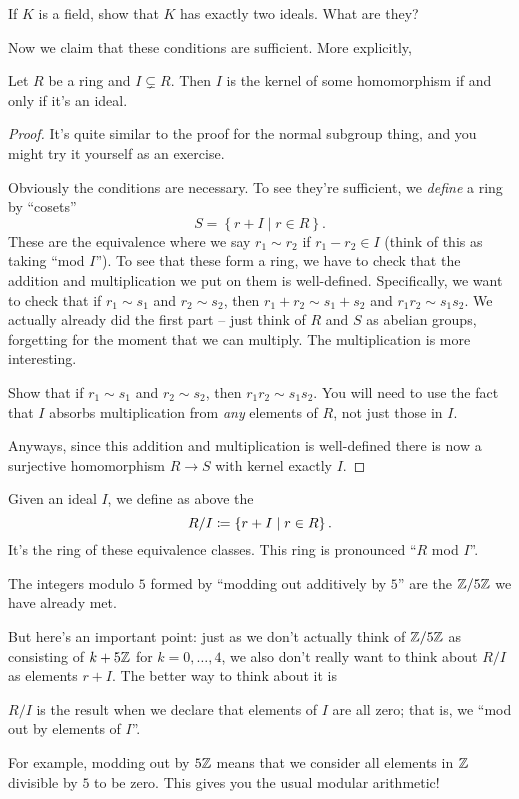 \begin{exercise}
	If $K$ is a field, show that $K$ has exactly two ideals.
	What are they?
	\label{exer:field_ideal}
\end{exercise}

Now we claim that these conditions are sufficient.
More explicitly,
\begin{theorem}
	Let $R$ be a ring and $I \subsetneq R$.
	Then $I$ is the kernel of some homomorphism if and only if it's an ideal.
\end{theorem}
\begin{proof}
	It's quite similar to the proof for the normal subgroup thing,
	and you might try it yourself as an exercise.
	
	Obviously the conditions are necessary.
	To see they're sufficient, we \emph{define} a ring by ``cosets''
	\[ S = \left\{ r + I \mid r \in R \right\}. \]
	These are the equivalence where we say $r_1 \sim r_2$ if $r_1 - r_2 \in I$
	(think of this as taking ``mod $I$'').
	To see that these form a ring, we have to check that the addition
	and multiplication we put on them is well-defined.
	Specifically, we want to check that if $r_1 \sim s_1$ and $r_2 \sim s_2$,
	then $r_1 + r_2 \sim s_1 + s_2$ and $r_1r_2 \sim s_1s_2$.
	We actually already did the first part
	-- just think of $R$ and $S$ as abelian
	groups, forgetting for the moment that we can multiply.
	The multiplication is more interesting.
	\begin{exercise}
		[Recommended]
		Show that if $r_1 \sim s_1$ and $r_2 \sim s_2$, then $r_1r_2 \sim s_1s_2$.
		You will need to use the fact that $I$ absorbs multiplication
		from \emph{any} elements of $R$, not just those in $I$.
	\end{exercise}
	Anyways, since this addition and multiplication is well-defined there
	is now a surjective homomorphism $R \to S$ with kernel exactly $I$.
\end{proof}

\begin{definition}
	Given an ideal $I$, we define as above the 
	\[ R/I \coloneqq \left\{ r+I \mid r \in R \right\}. \]
	It's the ring of these equivalence classes.
	This ring is pronounced ``$R$ mod $I$''.
\end{definition}
\begin{example}[$\ZZ/5\ZZ$]
	The integers modulo $5$ formed by ``modding out additively by $5$''
	are the $\mathbb Z/5\mathbb Z$ we have already met.
\end{example}
But here's an important point:
just as we don't actually think of $\ZZ/5\ZZ$ as consisting of
$k + 5\mathbb Z$ for $k=0,\dots,4$,
we also don't really want to think about $R/I$ as elements $r+I$.
The better way to think about it is
\begin{moral}
	$R/I$ is the result when we declare that elements of $I$ are all zero;
	that is, we ``mod out by elements of $I$''.
\end{moral}
For example, modding out by $5\mathbb Z$ means that we consider
all elements in $\mathbb Z$ divisible by $5$ to be zero.
This gives you the usual modular arithmetic!

